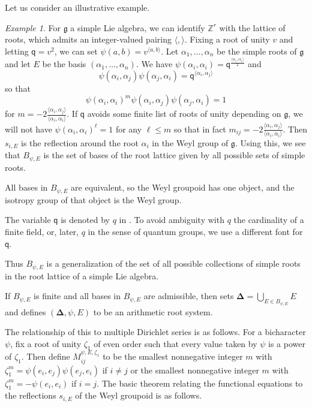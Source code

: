\documentclass[11pt,letterpaper]{article}
\theoremstyle{definition}
\theoremstyle{remark}
\newtheorem{example}[theorem]{Example}
\numberwithin{equation}{section}
\theoremstyle{dotless}
\newcommand{\hchi}{\psi} %
\newcommand{\gene}{\zeta_1} %
\newcommand{\qq}{\mathbf{ \mathsf{q}}} %
\begin{document}
Let us consider an illustrative example.

\begin{example}\label{cartan-example} For $\mathfrak g$ a simple Lie algebra, we can identify $\mathbb Z^r$ with the lattice of roots, which admits an integer-valued pairing $\langle, \rangle$. Fixing a root of unity $v$ and letting $\qq=v^2$, we can set $\hchi (a,b) =  v^{\langle a,b \rangle}$.  Let $\alpha_1,\dots,\alpha_n$ be the simple roots of $\mathfrak g$ and let $E $ be the basis $(\alpha_1,\dots,\alpha_n)$. We have $\hchi(\alpha_i,\alpha_i) = \qq^{ \frac{\langle \alpha_i, \alpha_i \rangle }{2} } $ and \[\hchi(\alpha_i,\alpha_j) \hchi(\alpha_j,\alpha_i) = \qq^{ \langle \alpha_i,\alpha_j\rangle}\] so that  \[\hchi(\alpha_i,\alpha_i)^m \hchi(\alpha_i,\alpha_j) \hchi(\alpha_j,\alpha_i)=1\] for $m = - 2 \frac{\langle \alpha_i,\alpha_j\rangle}{\langle \alpha_i,\alpha_i \rangle}$. If $\qq$ avoids some finite list of roots of unity depending on $\mathfrak g$, we will not have $\hchi(\alpha_i,\alpha_i)^{\ell}=1$ for any $\ell \leq m$ so that in fact $m_{ij}= - 2 \frac{\langle \alpha_i,\alpha_j\rangle}{\langle \alpha_i,\alpha_i \rangle}$. Then $s_{i,E}$ is the reflection around the root $\alpha_i$ in the Weyl group of $\mathfrak g$. Using this, we see that $B_{\hchi,E}$ is the set of bases of the root lattice given by all possible sets of simple roots.

All bases in $B_{\hchi, E}$ are equivalent, so the Weyl groupoid has one object, and the isotropy group of that object is the Weyl group. 

The variable $\qq$ is denoted by $q$ in \cite{AndruskiewitschAngiono, HeckenbergerClassification}. To avoid ambiguity with $q$ the cardinality of a finite field, or, later, $q$ in the sense of quantum groups, we use a different font for $\qq$. \end{example}


Thus $B_{\hchi,E}$ is a generalization of the set of all possible collections of simple roots in the root lattice of a simple Lie algebra.

If $B_{\hchi,E}$ is finite and all bases in $B_{\hchi,E}$ are admissible, then \cite[Definition 1]{HeckenbergerRank2} sets $\mathbf \Delta = \bigcup_{E \in  B_{\hchi,E}} E$ and defines $(\mathbf \Delta, \hchi, E)$ to be an \textrm{arithmetic root system}.




The relationship of this to multiple Dirichlet series is as follows. For a bicharacter $\hchi$, fix a root of unity $\gene$ of even order such that every value taken by $\hchi$ is a power of $\gene$. Then define  $M^{\hchi, E, \gene}_{ij} $ to be the smallest nonnegative integer $m$ with $\gene^m = \hchi(e_i,e_j) \hchi(e_j,e_i)$ if $i \neq j$ or the smallest nonnegative integer $m$ with $\gene^m = - \hchi(e_i,e_i)$ if $i=j$. The basic theorem relating the functional equations to the reflections $s_{i,E}$ of the Weyl groupoid is as follows.
\end{document}
